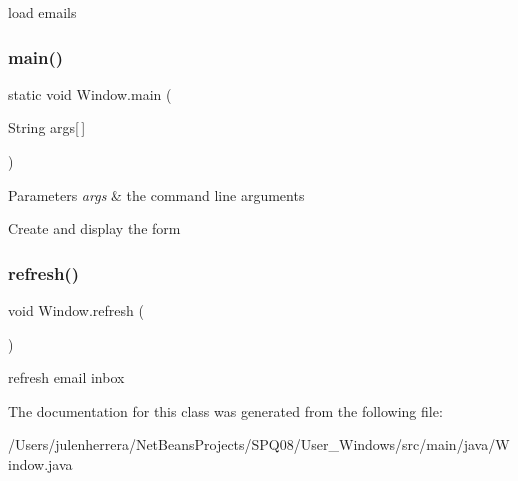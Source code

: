 load emails \mbox{\label{class_window_a95602e95a687fa2069944650a01d780e}} 
\subsubsection{\texorpdfstring{main()}{main()}}
{\footnotesize\ttfamily static void Window.\+main (\begin{DoxyParamCaption}\item[{String}]{args\mbox{[}$\,$\mbox{]} }\end{DoxyParamCaption})\hspace{0.3cm}{\ttfamily [static]}}


\begin{DoxyParams}{Parameters}
{\em args} & the command line arguments \\
\hline
\end{DoxyParams}
Create and display the form \mbox{\label{class_window_ae0c2bf00a564beb8f03ee2ae97a4feb5}} 
\subsubsection{\texorpdfstring{refresh()}{refresh()}}
{\footnotesize\ttfamily void Window.\+refresh (\begin{DoxyParamCaption}{ }\end{DoxyParamCaption})}

refresh email inbox 

The documentation for this class was generated from the following file\+:\begin{DoxyCompactItemize}
\item 
/\+Users/julenherrera/\+Net\+Beans\+Projects/\+S\+P\+Q08/\+User\+\_\+\+Windows/src/main/java/Window.\+java\end{DoxyCompactItemize}
